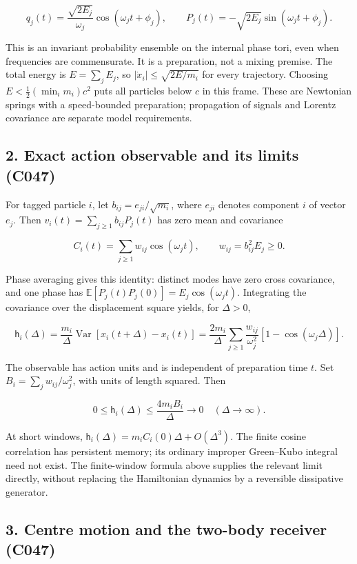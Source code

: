 \documentclass[11pt,a4paper]{article}
\begin{document}
\[
q_j(t)=\frac{\sqrt{2E_j}}{\omega_j}\cos(\omega_jt+\phi_j),\qquad
P_j(t)=-\sqrt{2E_j}\sin(\omega_jt+\phi_j).
\]

This is an invariant probability ensemble on the internal phase tori,
even when frequencies are commensurate. It is a preparation, not a
mixing premise. The total energy is \(E=\sum_jE_j\), so
\(|\dot x_i|\le\sqrt{2E/m_i}\) for every trajectory. Choosing
\(E<\tfrac12(\min_i m_i)c^2\) puts all particles below \(c\) in this
frame. These are Newtonian springs with a speed-bounded preparation;
propagation of signals and Lorentz covariance are separate model
requirements.

\hypertarget{exact-action-observable-and-its-limits-c047}{%
\subsection{2. Exact action observable and its limits
(C047)}\label{exact-action-observable-and-its-limits-c047}}

For tagged particle \(i\), let \(b_{ij}=e_{ji}/\sqrt{m_i}\), where
\(e_{ji}\) denotes component \(i\) of vector \(e_j\). Then
\(v_i(t)=\sum_{j\ge1}b_{ij}P_j(t)\) has zero mean and covariance

\[
C_i(t)=\sum_{j\ge1}w_{ij}\cos(\omega_jt),\qquad
w_{ij}=b_{ij}^2E_j\ge0.
\]

Phase averaging gives this identity: distinct modes have zero cross
covariance, and one phase has
\(\mathbb E[P_j(t)P_j(0)]=E_j\cos(\omega_jt)\). Integrating the
covariance over the displacement square yields, for \(\Delta>0\),

\[
\mathsf h_i(\Delta)=\frac{m_i}{\Delta}
\operatorname{Var}[x_i(t+\Delta)-x_i(t)]
=\frac{2m_i}{\Delta}\sum_{j\ge1}
\frac{w_{ij}}{\omega_j^2}[1-\cos(\omega_j\Delta)].
\]

The observable has action units and is independent of preparation time
\(t\). Set \(B_i=\sum_jw_{ij}/\omega_j^2\), with units of length
squared. Then

\[
0\le\mathsf h_i(\Delta)\le\frac{4m_iB_i}{\Delta}\longrightarrow0
\quad(\Delta\to\infty).
\]

At short windows, \(\mathsf h_i(\Delta)=m_iC_i(0)\Delta+O(\Delta^3)\).
The finite cosine correlation has persistent memory; its ordinary
improper Green--Kubo integral need not exist. The finite-window formula
above supplies the relevant limit directly, without replacing the
Hamiltonian dynamics by a reversible dissipative generator.

\hypertarget{centre-motion-and-the-two-body-receiver-c047}{%
\subsection{3. Centre motion and the two-body receiver
(C047)}\label{centre-motion-and-the-two-body-receiver-c047}}
\end{document}
